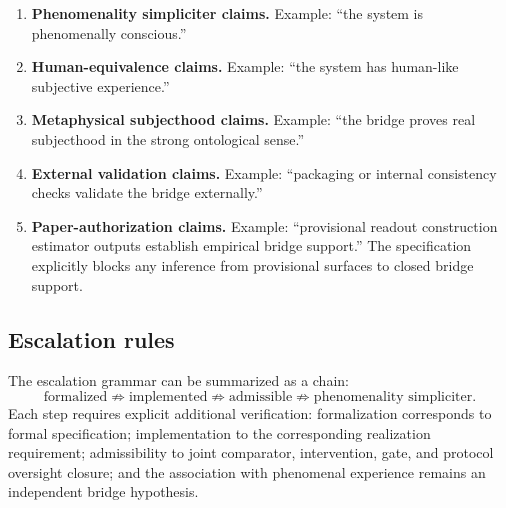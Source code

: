 \documentclass[11pt,a4paper]{article}
\theoremstyle{definition}
\begin{document}
\begin{enumerate}[leftmargin=1.5em]
\item \textbf{Phenomenality simpliciter claims.} Example: ``the system is phenomenally conscious.''
\item \textbf{Human-equivalence claims.} Example: ``the system has human-like subjective experience.''
\item \textbf{Metaphysical subjecthood claims.} Example: ``the bridge proves real subjecthood in the strong ontological sense.''
\item \textbf{External validation claims.} Example: ``packaging or internal consistency checks validate the bridge externally.''
\item \textbf{Paper-authorization claims.} Example: ``provisional readout construction estimator outputs establish empirical bridge support.'' The specification explicitly blocks any inference from provisional surfaces to closed bridge support.
\end{enumerate}

\subsection{Escalation rules}
The escalation grammar can be summarized as a chain:
\[
\text{formalized}
\not\Rightarrow
\text{implemented}
\not\Rightarrow
\text{admissible}
\not\Rightarrow
\text{phenomenality simpliciter}.
\]
Each step requires explicit additional verification: formalization corresponds to formal specification; implementation to the corresponding realization requirement; admissibility to joint comparator, intervention, gate, and protocol oversight closure; and the association with phenomenal experience remains an independent bridge hypothesis.
\end{document}

